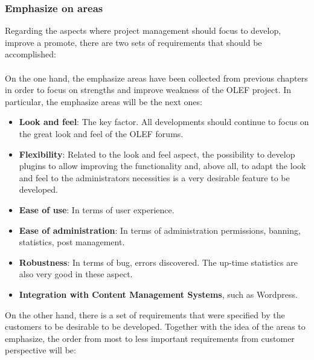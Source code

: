 \documentclass[11pt]{article}
\begin{document}
\subsubsection{Emphasize on areas}
Regarding the aspects where project management should focus to develop, improve a promote, there are two sets of requirements that should be accomplished:\\
\\
On the one hand, the emphasize areas have been collected from previous chapters in order to focus on strengths and improve weakness of the OLEF project. In particular, the emphasize areas will be the next ones:
\begin{itemize}\itemsep0pt
\item{\textbf{Look and feel}}: The key factor. All developments should continue to focus on the great look and feel of the OLEF forums.
\item{\textbf{Flexibility}}: Related to the look and feel aspect, the possibility to develop plugins to allow  improving the functionality and, above all, to adapt the look and feel to the administrators necessities is a very desirable feature to be developed.
\item{\textbf{Ease of use}}: In terms of user experience. 
\item{\textbf{Ease of administration}}: In terms of administration permissions, banning, statistics, post management.
\item{\textbf{Robustness}}: In terms of bug, errors discovered. The up-time statistics are also very good in these aspect.
\item{\textbf{Integration with Content Management Systems}}, such as Wordpress.
\end{itemize}
On the other hand, there is a set of requirements that were specified by the customers to be desirable to be developed. Together with the idea of the areas to emphasize, the order from most to less important requirements from customer perspective will be:
\end{document}
